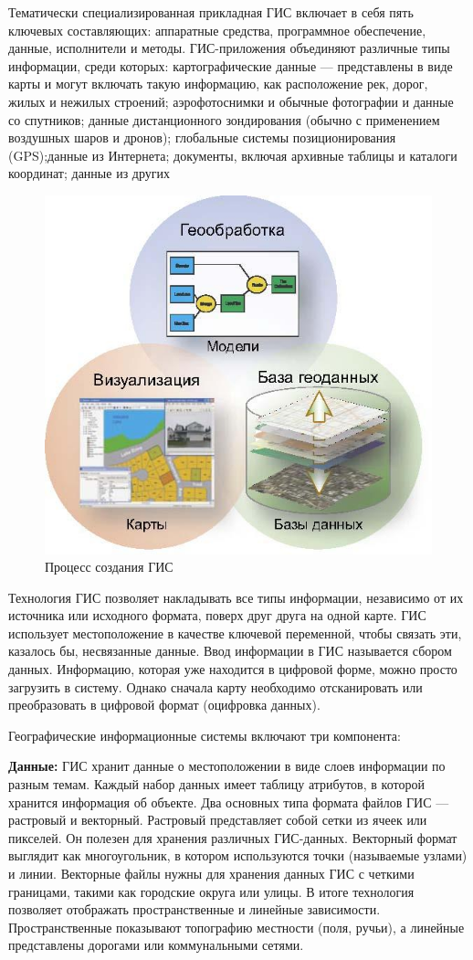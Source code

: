 \documentclass[732,fontsize=14pt,final]{studrep}
\begin{document}
Тематически специализированная прикладная ГИС включает в себя пять ключевых составляющих: аппаратные средства, программное обеспечение, данные, исполнители и методы. ГИС-приложения объединяют различные типы информации, среди которых: картографические данные — представлены в виде карты и могут включать такую информацию, как расположение рек, дорог, жилых и нежилых строений; аэрофотоснимки и обычные фотографии и данные со спутников; данные дистанционного зондирования (обычно с применением воздушных шаров и дронов); глобальные системы позиционирования (GPS);данные из Интернета; документы, включая архивные таблицы и каталоги координат; данные из других

  \begin{figure}[htp]
	\centering
	\includegraphics[width=0.7\linewidth]{pics/image15.png}
    \caption{Процесс создания ГИС}
    \label{fig:gis-design-process}
  \end{figure}

Технология ГИС позволяет накладывать все типы информации, независимо от их источника или исходного формата, поверх друг друга на одной карте. ГИС использует местоположение в качестве ключевой переменной, чтобы связать эти, казалось бы, несвязанные данные.
Ввод информации в ГИС называется сбором данных. Информацию, которая уже находится в цифровой форме, можно просто загрузить в систему. Однако сначала карту необходимо отсканировать или преобразовать в цифровой формат (оцифровка данных).

Географические информационные системы включают три компонента:

\textbf{Данные:} ГИС хранит данные о местоположении в виде слоев информации по разным темам. Каждый набор данных имеет таблицу атрибутов, в которой хранится информация об объекте. Два основных типа формата файлов ГИС — растровый и векторный. Растровый представляет собой сетки из ячеек или пикселей. Он полезен для хранения различных ГИС-данных. Векторный формат выглядит как многоугольник, в котором используются точки (называемые узлами) и линии. Векторные файлы нужны для хранения данных ГИС с четкими границами, такими как городские округа или улицы. В итоге технология позволяет отображать пространственные и линейные зависимости. Пространственные показывают топографию местности (поля, ручьи), а линейные представлены дорогами или коммунальными сетями.
\end{document}
